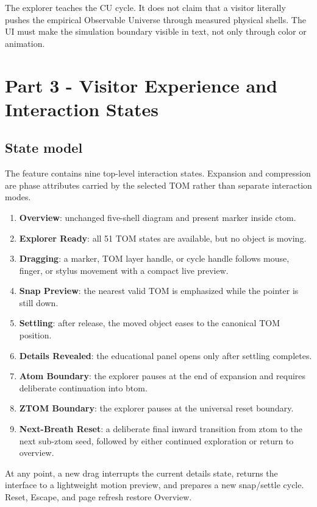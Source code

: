 \documentclass[11pt,letterpaper]{article}
\newcommand{\term}[1]{\textbf{\textsf{#1}}}
\begin{document}
\begin{checkpointbox}
The explorer teaches the CU cycle. It does not claim that a visitor literally pushes the empirical Observable Universe through measured physical shells. The UI must make the simulation boundary visible in text, not only through color or animation.
\end{checkpointbox}

\section{Part 3 - Visitor Experience and Interaction States}
\subsection{State model}
The feature contains nine top-level interaction states. Expansion and compression are phase attributes carried by the selected TOM rather than separate interaction modes.
\begin{enumerate}
\item \term{Overview}: unchanged five-shell diagram and present marker inside ctom.
\item \term{Explorer Ready}: all 51 TOM states are available, but no object is moving.
\item \term{Dragging}: a marker, TOM layer handle, or cycle handle follows mouse, finger, or stylus movement with a compact live preview.
\item \term{Snap Preview}: the nearest valid TOM is emphasized while the pointer is still down.
\item \term{Settling}: after release, the moved object eases to the canonical TOM position.
\item \term{Details Revealed}: the educational panel opens only after settling completes.
\item \term{Atom Boundary}: the explorer pauses at the end of expansion and requires deliberate continuation into btom.
\item \term{ZTOM Boundary}: the explorer pauses at the universal reset boundary.
\item \term{Next-Breath Reset}: a deliberate final inward transition from ztom to the next sub-ztom seed, followed by either continued exploration or return to overview.
\end{enumerate}

At any point, a new drag interrupts the current details state, returns the interface to a lightweight motion preview, and prepares a new snap/settle cycle. Reset, Escape, and page refresh restore Overview.
\end{document}
